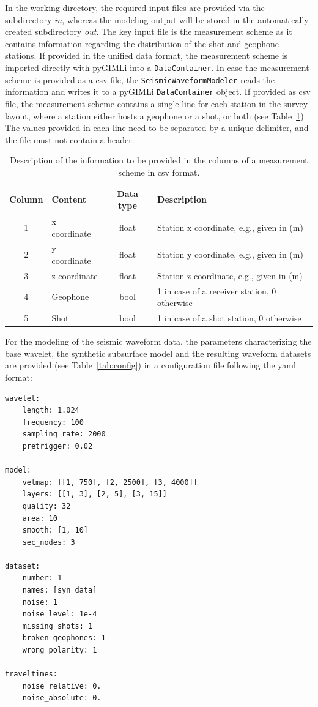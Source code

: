 \documentclass[a4paper,fleqn]{cas-sc}
\begin{document}
In the working directory, the required input files are provided via the subdirectory \textit{in}, whereas the modeling output will be stored in the automatically created subdirectory \textit{out}. The key input file is the measurement scheme as it contains information regarding the distribution of the shot and geophone stations. If provided in the unified data format, the measurement scheme is imported directly with pyGIMLi into a \texttt{DataContainer}. In case the measurement scheme is provided as a csv file, the \texttt{SeismicWaveformModeler} reads the information and writes it to a pyGIMLi \texttt{DataContainer} object. If provided as csv file, the measurement scheme contains a single line for each station in the survey layout, where a station either hosts a geophone or a shot, or both (see Table~\ref{tab:scheme}). The values provided in each line need to be separated by a unique delimiter, and the file must not contain a header.
\begin{table}%
    \caption{Description of the information to be provided in the columns of a measurement scheme in csv format.}
    \centering
    \begin{tabular}{clcl}
        \toprule
        Column & \textbf{Content} & \textbf{Data type} & \textbf{Description} \\
        \midrule
        1 & x coordinate & float & Station x coordinate, e.g., given in (m) \\ 
        2 & y coordinate & float & Station y coordinate, e.g., given in (m) \\ 
        3 & z coordinate & float & Station z coordinate, e.g., given in (m) \\ 
        4 & Geophone & bool & 1 in case of a receiver station, 0 otherwise \\ 
        5 & Shot & bool & 1 in case of a shot station, 0 otherwise \\
        \bottomrule
    \end{tabular}
    \label{tab:scheme}
\end{table}

For the modeling of the seismic waveform data, the parameters characterizing the base wavelet, the synthetic subsurface model and the resulting waveform datasets are provided (see Table~\ref{tab:config}) in a configuration file following the yaml format:

\begin{footnotesize}
\begin{verbatim}
wavelet:
    length: 1.024
    frequency: 100
    sampling_rate: 2000
    pretrigger: 0.02

model:
    velmap: [[1, 750], [2, 2500], [3, 4000]]
    layers: [[1, 3], [2, 5], [3, 15]]
    quality: 32
    area: 10
    smooth: [1, 10]
    sec_nodes: 3    

dataset:
    number: 1
    names: [syn_data]
    noise: 1
    noise_level: 1e-4
    missing_shots: 1
    broken_geophones: 1
    wrong_polarity: 1
    
traveltimes:
    noise_relative: 0.
    noise_absolute: 0.
\end{verbatim}
\end{footnotesize}
\end{document}
